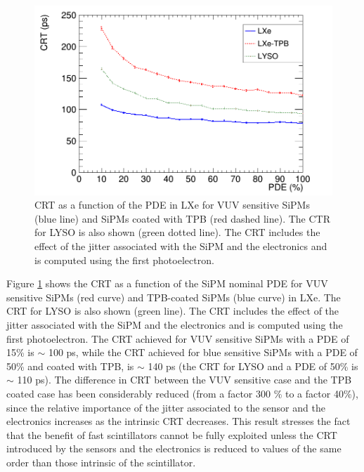 \documentclass[review]{elsarticle}
\begin{document}
 \begin{figure}[!bhtp]
	\centering
	\includegraphics[scale=0.4]{../img/CTR_jitter_fixed_n.png}
	\caption{\label{fig.crt3} CRT as a function of the PDE in LXe for VUV sensitive SiPMs (blue line) and SiPMs coated with TPB (red dashed line). The CTR for LYSO is also shown (green dotted line). The CRT includes the
	effect of the jitter associated with the SiPM and the electronics and is computed using the first photoelectron.}
\end{figure}

Figure \ref{fig.crt3} shows the CRT as a function of the
 SiPM nominal PDE for VUV sensitive SiPMs (red curve) and TPB-coated SiPMs (blue curve) in LXe. The CRT for LYSO is also shown (green line). The CRT includes the
effect of the jitter associated with the SiPM and the electronics and is computed using the first photoelectron.
The CRT achieved for VUV sensitive SiPMs with a PDE of 15\% is $\sim$ 100 ps, while  the CRT achieved for blue sensitive SiPMs with a PDE of 50\% and coated with TPB, is $\sim$ 140 ps (the CRT for LYSO and a PDE of 50\% is 
$\sim$ 110 ps). The difference in CRT between the VUV sensitive case and the TPB coated case has been considerably reduced (from a factor 300 \% to a factor 40\%), since the relative importance of the jitter associated to the sensor and the electronics increases as the intrinsic CRT decreases. This result stresses the fact that the benefit of fast scintillators cannot be fully exploited unless the CRT introduced by the sensors and the electronics is reduced to values of the same order than those intrinsic of the scintillator. 
\end{document}

